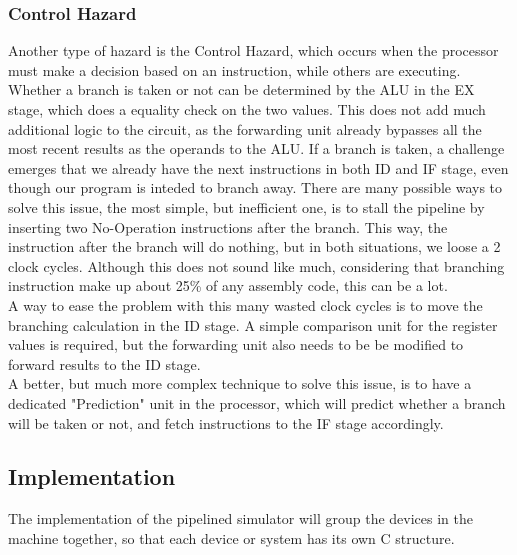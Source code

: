 \subsubsection{Control Hazard}
Another type of hazard is the Control Hazard, which occurs when the processor
must make a decision based on an instruction, while others are executing.
Whether a branch is taken or not can be determined by the ALU in the EX stage,
which does a equality check on the two values. This does not add much additional
logic to the circuit, as the forwarding unit already bypasses all the most recent
results as the operands to the ALU. If a branch is taken, a challenge emerges
that we already have the next instructions in both ID and IF stage, even though
our program is inteded to branch away. There are many
possible ways to solve this issue, the most simple, but inefficient one, is to
stall the pipeline by inserting two No-Operation instructions after the branch. This way,
the instruction after the branch will do nothing, but in both situations, we
loose a 2 clock cycles. Although this does not sound like much, considering that
branching instruction make up about 25\% of any assembly code\cite{instruction_frequency},
this can be a lot.\\
A way to ease the problem with this many wasted clock cycles is to move the
branching calculation in the ID stage. A simple comparison unit for the register
values is required, but the forwarding unit also needs to be be modified to
forward results to the ID stage.\\

A better, but much more complex technique to solve this issue, is to have a
dedicated "Prediction" unit in the processor, which will predict whether a branch will be
taken or not, and fetch instructions to the IF stage accordingly.


\subsection{Implementation}
The implementation of the pipelined simulator will group the devices in the
machine together, so that each device or system has its own C structure.

